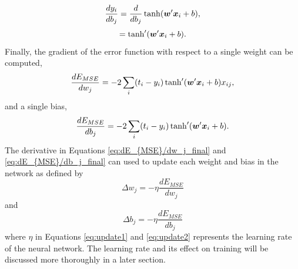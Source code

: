 %
\begin{equation} \label{dE_{MSE}/dw_j}
\frac{dy_i}{db_j} = \frac{d}{db_j} \tanh(\boldsymbol{w}'\boldsymbol{x}_i + b),
\end{equation}
%
\begin{equation} \label{dE_{MSE}/dy_i}
 = \tanh'( \boldsymbol{w}' \boldsymbol{x}_i + b).
\end{equation}
%
Finally, the gradient of the error function with respect to a single weight can be computed, 
%
\begin{equation} \label{eq:dE_{MSE}/dw_j_final}
\frac{dE_{MSE}}{dw_j} =  -2 \sum_i  (t_i - y_i) \tanh'( \boldsymbol{w}' \boldsymbol{x}_i + b)  x_{ij},
\end{equation}
%
and a single bias,
%
\begin{equation} \label{eq:dE_{MSE}/db_j_final}
\frac{dE_{MSE}}{db_j} =  -2 \sum_i  (t_i - y_i) \tanh'( \boldsymbol{w}' \boldsymbol{x}_i + b).
\end{equation}
%
The derivative in Equations \ref{eq:dE_{MSE}/dw_j_final} and \ref{eq:dE_{MSE}/db_j_final} can used to update each weight and bias in the network as defined by 
%
\begin{equation} \label{eq:update1}
\Delta w_{j} = - \eta \frac{dE_{MSE}}{dw_j}
\end{equation}
%
and 
%
\begin{equation} \label{eq:update2}
\Delta b_{j} = - \eta \frac{dE_{MSE}}{db_j}
\end{equation}
%
where $\eta$ in Equations \ref{eq:update1} and \ref{eq:update2} represents the learning rate of the neural network. The learning rate and its effect on training will be discussed more thoroughly in a later section.

